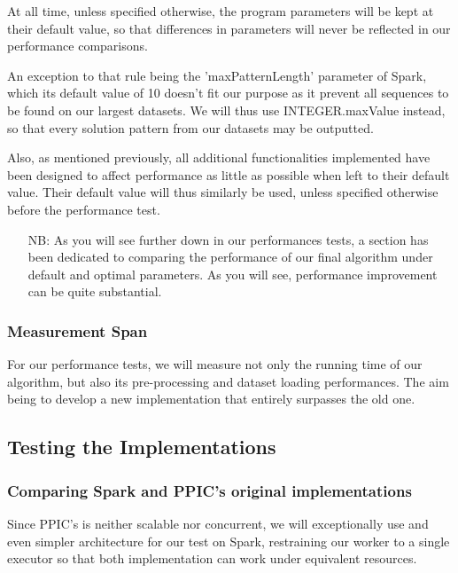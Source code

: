 \documentclass{eplmastersthesis}
\begin{document}
At all time, unless specified otherwise, the program parameters will be kept at their default value, so that differences in parameters will never be reflected in our performance comparisons.\newline

An exception to that rule being the 'maxPatternLength' parameter of Spark, which its default value of 10 doesn't fit our purpose as it prevent all sequences to be found on our largest datasets. We will thus use INTEGER.maxValue instead, so that every solution pattern from our datasets may be outputted.\newline

Also, as mentioned previously, all additional functionalities implemented have been designed to affect performance as little as possible when left to their default value. Their default value will thus similarly be used, unless specified otherwise before the performance test.

\begin{itemize}
  \item[NB:] As you will see further down in our performances tests, a section has been dedicated to comparing the performance of our final algorithm under default and optimal parameters. As you will see, performance improvement can be quite substantial. 
\end{itemize}

\subsubsection{Measurement Span}

For our performance tests, we will measure not only the running time of our algorithm, but also its pre-processing and dataset loading performances. The aim being to develop a new implementation that entirely surpasses the old one.

\subsection{Testing the Implementations}

\subsubsection{Comparing Spark and PPIC's original implementations}

Since PPIC's is neither scalable nor concurrent, we will exceptionally use and even simpler architecture for our test on Spark, restraining our worker to a single executor so that both implementation can work under equivalent resources. \newline
\end{document}
